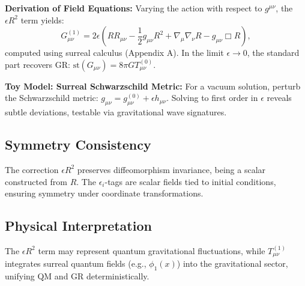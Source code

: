 \documentclass{article}
\begin{document}
\textbf{Derivation of Field Equations:} Varying the action with respect to \( g^{\mu\nu} \), the \(\epsilon R^2\) term yields:
\[
G_{\mu\nu}^{(1)} = 2\epsilon \left( R R_{\mu\nu} - \frac{1}{2} g_{\mu\nu} R^2 + \nabla_\mu \nabla_\nu R - g_{\mu\nu} \Box R \right),
\]
computed using surreal calculus (Appendix A). In the limit \(\epsilon \to 0\), the standard part recovers GR: \(\text{st}(G_{\mu\nu}) = 8\pi G T_{\mu\nu}^{(0)}\).

\textbf{Toy Model: Surreal Schwarzschild Metric:} For a vacuum solution, perturb the Schwarzschild metric: \( g_{\mu\nu} = g_{\mu\nu}^{(0)} + \epsilon h_{\mu\nu} \). Solving to first order in \(\epsilon\) reveals subtle deviations, testable via gravitational wave signatures.

\subsection{Symmetry Consistency}
The correction \(\epsilon R^2\) preserves diffeomorphism invariance, being a scalar constructed from \( R \). The \(\epsilon_i\)-tags are scalar fields tied to initial conditions, ensuring symmetry under coordinate transformations.

\subsection{Physical Interpretation}
The \(\epsilon R^2\) term may represent quantum gravitational fluctuations, while \( T_{\mu\nu}^{(1)} \) integrates surreal quantum fields (e.g., \(\phi_1(x)\)) into the gravitational sector, unifying QM and GR deterministically.
\end{document}
